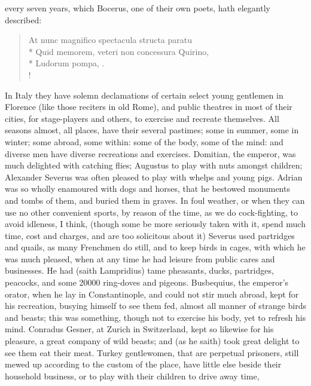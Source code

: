 {every seven years, which Bocerus, one of their own poets, hath
elegantly described:
%
%
\begin{latin}%
\begin{verse}%
At nunc magnifico spectacula structa paratu\\*
Quid memorem, veteri non concessura Quirino,\\*
Ludorum pompa, \etc{}.\\!
\end{verse}%
\end{latin}%
%
In Italy they have solemn declamations of certain select young
gentlemen in Florence (like those reciters in old Rome), and public
theatres in most of their cities, for stage-players and others, to
exercise and recreate themselves. All seasons almost, all places, have
their several pastimes; some in summer, some in winter; some abroad,
some within: some of the body, some of the mind: and diverse men have
diverse recreations and exercises. Domitian, the emperor, was much
delighted with catching flies; Augustus to play with nuts amongst
children; Alexander Severus was often pleased to play with whelps
and young pigs. Adrian was so wholly enamoured with dogs and
horses, that he bestowed monuments and tombs of them, and buried them
in graves. In foul weather, or when they can use no other convenient
sports, by reason of the time, as we do cock-fighting, to avoid
idleness, I think, (though some be more seriously taken with it, spend
much time, cost and charges, and are too solicitous about it)
Severus used partridges and quails, as many Frenchmen do still,
and to keep birds in cages, with which he was much pleased, when at any
time he had leisure from public cares and businesses. He had (saith
Lampridius) tame pheasants, ducks, partridges, peacocks, and some
20\thinspace{}000 ring-doves and pigeons. Busbequius, the emperor's orator, when
he lay in Constantinople, and could not stir much abroad, kept for his
recreation, busying himself to see them fed, almost all manner of
strange birds and beasts; this was something, though not to exercise
his body, yet to refresh his mind. Conradus Gesner, at Zurich in
Switzerland, kept so likewise for his pleasure, a great company of wild
beasts; and (as he saith) took great delight to see them eat their
meat. Turkey gentlewomen, that are perpetual prisoners, still mewed up
according to the custom of the place, have little else beside their
household business, or to play with their children to drive away time,
}
